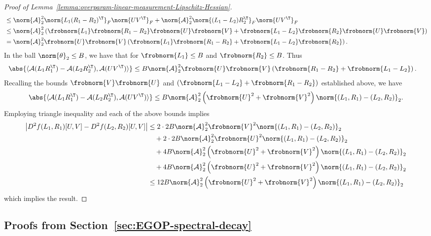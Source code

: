 \begin{proof}[Proof of Lemma~\ref{lemma:overparam-linear-measurement-Lipschitz-Hessian}]
\begin{align*}
        &\leq \norm{\mathcal{A}}^2_2\norm{L_1 (R_1-R_2)^\T}_F\norm{UV^\T}_F +\norm{\mathcal{A}}^2_2\norm{(L_1-L_2)R_2^\T}_F\norm{ UV^\T}_F\\
        &\leq \norm{\mathcal{A}}^2_2\left(\frobnorm{L_1} \frobnorm{R_1-R_2}\frobnorm{U}\frobnorm{V} +\frobnorm{L_1-L_2}\frobnorm{R_2}\frobnorm{U}\frobnorm{V}\right)\\
        &= \norm{\mathcal{A}}^2_2\frobnorm{U}\frobnorm{V}\left(\frobnorm{L_1} \frobnorm{R_1-R_2} +\frobnorm{L_1-L_2}\frobnorm{R_2}\right).
    \end{align*}
    In the ball $\norm{\theta}_2 \leq B$, we have that for $\frobnorm{L_1} \leq B$ and $\frobnorm{R_2}\leq B$. Thus
    \begin{align*}
        \abs{\langle \mathcal{A}(L_1 R_1^\T)-\mathcal{A}(L_2 R_2^\T), \mathcal{A}(UV^\T)\rangle} &\leq B\norm{\mathcal{A}}^2_2\frobnorm{U}\frobnorm{V}\left(\frobnorm{R_1-R_2} +\frobnorm{L_1-L_2}\right).
    \end{align*}
    Recalling the bounds $\frobnorm{V} \frobnorm{U}$ and $\left(\frobnorm{L_1 - L_2}+\frobnorm{R_1 - R_2}\right)$ established above, we have
    \[
        \abs{\langle \mathcal{A}(L_1 R_1^\T)-\mathcal{A}(L_2 R_2^\T), \mathcal{A}(UV^\T)\rangle} \leq B\norm{\mathcal{A}}^2_2\left(\frobnorm{U}^2+\frobnorm{V}^2\right)\norm{(L_1, R_1)-(L_2,R_2)}_2.
    \]
    Employing triangle inequality and each of the above bounds implies
    \begin{align*}
        \left|D^2f(L_1, R_1)[U,V] - D^2f(L_2, R_2)[U,V]\right|&\leq 2\cdot 2B \norm{\mathcal{A}}^2_2 \frobnorm{V}^2 \norm{(L_1, R_1)-(L_2, R_2)}_2\\
        &\quad + 2\cdot 2B \norm{\mathcal{A}}^2_2 \frobnorm{U}^2 \norm{(L_1, R_1)-(L_2, R_2)}_2\\
        &\quad + 4B \norm{\mathcal{A}}^2_2\left(\frobnorm{U}^2 + \frobnorm{V}^2\right)\norm{(L_1,R_1) - (L_2, R_2)}_2\\
        &\quad +4B\norm{\mathcal{A}}^2_2\left(\frobnorm{U}^2+\frobnorm{V}^2\right)\norm{(L_1, R_1)-(L_2,R_2)}_2\\
        &\leq 12 B \norm{\mathcal{A}}^2_2\left(\frobnorm{U}^2+\frobnorm{V}^2\right)\norm{(L_1, R_1)-(L_2,R_2)}_2
    \end{align*}
    which implies the result.
\end{proof}

\subsection{Proofs from Section~\ref{sec:EGOP-spectral-decay}}\label{ssec:spectral-decay-proofs}

